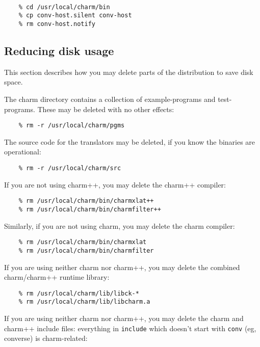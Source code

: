 \begin{verbatim}

    % cd /usr/local/charm/bin
    % cp conv-host.silent conv-host
    % rm conv-host.notify

\end{verbatim}

\subsection{Reducing disk usage}

This section describes how you may delete parts of the distribution to
save disk space.  

The charm directory contains a collection of example-programs and
test-programs.  These may be deleted with no other effects:

\begin{verbatim}
    % rm -r /usr/local/charm/pgms
\end{verbatim}

The source code for the translators may be deleted, if you know the
binaries are operational:

\begin{verbatim}
    % rm -r /usr/local/charm/src
\end{verbatim}

If you are not using charm++, you may delete the charm++ compiler:

\begin{verbatim}
    % rm /usr/local/charm/bin/charmxlat++
    % rm /usr/local/charm/bin/charmfilter++
\end{verbatim}

Similarly, if you are not using charm, you may delete the charm compiler:

\begin{verbatim}
    % rm /usr/local/charm/bin/charmxlat
    % rm /usr/local/charm/bin/charmfilter
\end{verbatim}

If you are using neither charm nor charm++, you may delete the
combined charm/charm++ runtime library:

\begin{verbatim}
    % rm /usr/local/charm/lib/libck-*
    % rm /usr/local/charm/lib/libcharm.a
\end{verbatim}

If you are using neither charm nor charm++, you may delete the charm
and charm++ include files: everything in {\tt include} which doesn't
start with {\tt conv} (eg, converse) is charm-related:

